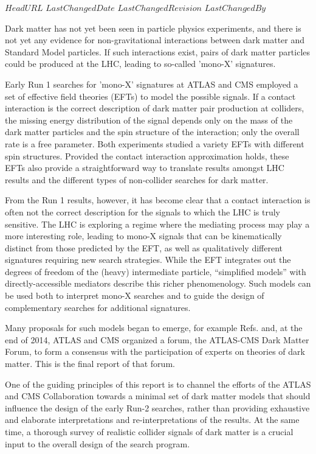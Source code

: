 \svnidlong
{$HeadURL$}
{$LastChangedDate$}
{$LastChangedRevision$}
{$LastChangedBy$}

Dark matter has not yet been seen in particle physics experiments, and
there is not yet any evidence for non-gravitational interactions between dark
matter and Standard Model particles.  If such interactions exist,
pairs of dark matter particles could be produced at the LHC, leading
to so-called 'mono-X' signatures.

Early Run 1 searches for 'mono-X' signatures at ATLAS and CMS employed
a set of effective field theories (EFTs) \cite{Goodman:2010ku} to
model the possible signals. If a contact interaction is the correct
description of dark matter pair production at colliders, the missing
energy distribution of the signal depends only on the mass of the dark
matter particles and the spin structure of the interaction; only the
overall rate is a free parameter. Both experiments studied a variety
EFTs with different spin structures. Provided the contact interaction
approximation holds, these EFTs also provide a straightforward way to
translate results amongst LHC results and the different types of
non-collider searches for dark matter.

From the Run 1 results, however, it has become clear
\cite{Busoni:2013lha} that a contact interaction is often not the
correct description for the signals to which the LHC is truly
sensitive. The LHC is exploring a regime where the mediating process
may play a more interesting role, leading to mono-X signals that can
be kinematically distinct from those predicted by the EFT, as well as
qualitatively different signatures requiring new search
strategies. While the EFT integrates out the degrees of freedom of the
(heavy) intermediate particle, ``simplified models''
\cite{Alves:2011wf} with directly-accessible mediators describe this
richer phenomenology. Such models can be used both to interpret mono-X
searches and to guide the design of complementary searches for
additional signatures. 

Many proposals for such models began to emerge, for example
Refs. \cite{An:2012va,An:2012ue,Tait:2013,Buchmueller:2013dya,Bai:2013iqa,Bai:2014osa,An:201489115014,Yavin:14092893,Malik:2014ggr,Harris:2014hga,Buckley:2014fba}
and, at the end of 2014, ATLAS and CMS organized a forum, the
ATLAS-CMS Dark Matter Forum, to form a consensus with the
participation of experts on theories of dark matter. This is the final
report of that forum.

One of the guiding principles of this report is to channel the efforts
of the ATLAS and CMS Collaboration towards a minimal set of dark
matter models that should influence the design of the early Run-2
searches, rather than providing exhaustive and elaborate
interpretations and re-interpretations of the results. At the same
time, a thorough survey of realistic collider signals of dark matter
is a crucial input to the overall design of the search program.

